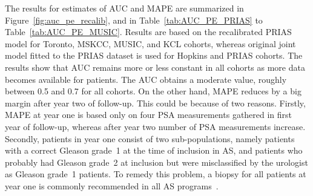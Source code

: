 The results for estimates of AUC and MAPE are summarized in Figure~\ref{fig:auc_pe_recalib}, and in Table~\ref{tab:AUC_PE_PRIAS} to Table~\ref{tab:AUC_PE_MUSIC}. Results are based on the recalibrated PRIAS model for Toronto, MSKCC, MUSIC, and KCL cohorts, whereas original joint model fitted to the PRIAS dataset is used for Hopkins and PRIAS cohorts. The results show that AUC remains more or less constant in all cohorts as more data becomes available for patients. The AUC obtains a moderate value, roughly between 0.5 and 0.7 for all cohorts. On the other hand, MAPE reduces by a big margin after year two of follow-up. This could be because of two reasons. Firstly, MAPE at year one is based only on four PSA measurements gathered in first year of follow-up, whereas after year two number of PSA measurements increase. Secondly, patients in year one consist of two sub-populations, namely patients with a correct Gleason grade~1 at the time of inclusion in AS, and patients who probably had Gleason grade~2 at inclusion but were misclassified by the urologist as Gleason grade~1 patients. To remedy this problem, a biopsy for all patients at year one is commonly recommended in all AS programs~\citep{bokhorst2015compliance}.

